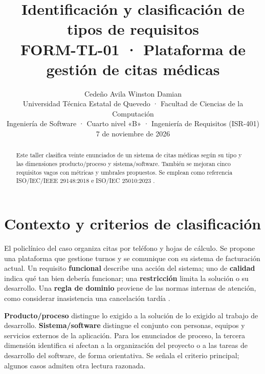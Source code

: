 \documentclass[10pt,a4paper,onecolumn]{IEEEtran}
\title{Identificación y clasificación de tipos de requisitos\\
\large FORM-TL-01 · Plataforma de gestión de citas médicas}
\author{Cedeño Avila Winston Damian\\
{\small Universidad Técnica Estatal de Quevedo · Facultad de Ciencias de la Computación}\\
{\small Ingeniería de Software · Cuarto nivel «B» · Ingeniería de Requisitos (ISR-401)}\\
{\small 7 de noviembre de 2026}}
\begin{document}
\maketitle
\begin{abstract}
Este taller clasifica veinte enunciados de un sistema de citas médicas según su tipo y las dimensiones producto/proceso y sistema/software. También se mejoran cinco requisitos vagos con métricas y umbrales propuestos. Se emplean como referencia ISO/IEC/IEEE 29148:2018 e ISO/IEC 25010:2023 \cite{iso29148,iso25010}.
\end{abstract}

\section{Contexto y criterios de clasificación}
El policlínico del caso organiza citas por teléfono y hojas de cálculo. Se propone una plataforma que gestione turnos y se comunique con su sistema de facturación actual. Un requisito \textbf{funcional} describe una acción del sistema; uno de \textbf{calidad} indica qué tan bien debería funcionar; una \textbf{restricción} limita la solución o su desarrollo. Una \textbf{regla de dominio} proviene de las normas internas de atención, como considerar inasistencia una cancelación tardía \cite{iso29148,pohl2025}.

\textbf{Producto/proceso} distingue lo exigido a la solución de lo exigido al trabajo de desarrollo. \textbf{Sistema/software} distingue el conjunto con personas, equipos y servicios externos de la aplicación. Para los enunciados de proceso, la tercera dimensión identifica si afectan a la organización del proyecto o a las tareas de desarrollo del software, de forma orientativa. Se señala el criterio principal; algunos casos admiten otra lectura razonada.
\end{document}
